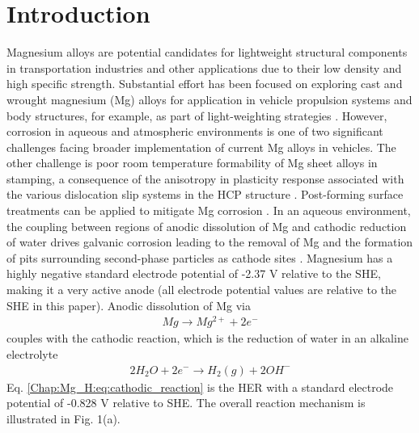 \section{Introduction}
Magnesium alloys are potential candidates for lightweight structural components in transportation industries and other applications due to their low density and high specific strength. Substantial effort has been focused on exploring cast and wrought magnesium (Mg) alloys for application in vehicle propulsion systems and body structures, for example, as part of light-weighting strategies \cite{luo2005development, luo2006wrought,carter2011structural, jekl2015development, luo2013magnesium}. However, corrosion in aqueous and atmospheric environments is one of two significant challenges facing broader implementation of current Mg alloys in vehicles. The other challenge is poor room temperature formability of Mg sheet alloys in stamping, a consequence of the anisotropy in plasticity response associated with the various dislocation slip systems in the \ac{HCP} structure \cite{yasi2010first}. Post-forming surface treatments can be applied to mitigate Mg corrosion \cite{zheng2005corrosion}. 
In an aqueous environment, the coupling between regions of anodic dissolution of Mg and cathodic reduction of water drives galvanic corrosion leading to the removal of Mg and the formation of pits surrounding second-phase particles as cathode sites \cite{birbilis2014evidence, zeng2006review}. Magnesium has a highly negative standard electrode potential of -2.37 V relative to the \ac{SHE}, making it a very active anode (all electrode potential values are relative to the \ac{SHE} in this paper). Anodic dissolution of Mg via 
\begin{align}
Mg \rightarrow Mg^{2+} + 2e^{-}
 \label{Chap:Mg_H:eq:anodic_dissolution}
\end{align}
couples with the cathodic reaction, which is the reduction of water in an alkaline electrolyte 
\begin{align}
2H_2O + 2e^{-} \rightarrow H_{2}(g) + 2OH^{-}
 \label{Chap:Mg_H:eq:cathodic_reaction}
\end{align}
Eq. \ref{Chap:Mg_H:eq:cathodic_reaction} is the \ac{HER} with a standard electrode potential of -0.828 V relative to \ac{SHE}. The overall reaction mechanism is illustrated in Fig. 1(a). 

